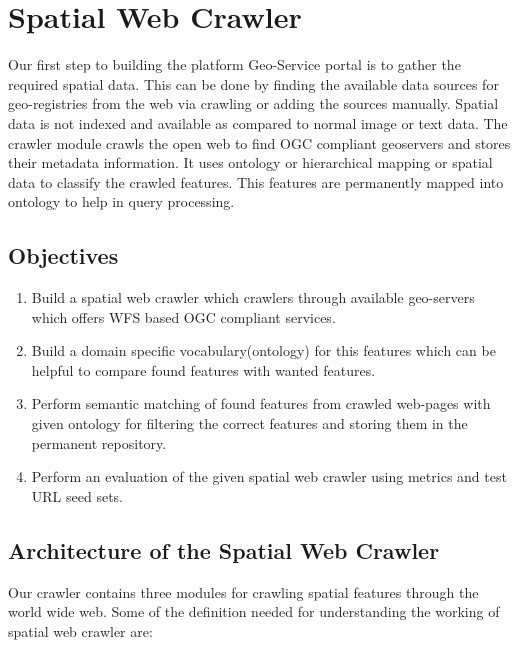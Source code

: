 \chapter{Spatial Web Crawler}
Our first step to building the platform Geo-Service portal is to gather the required spatial data. This can be done by finding the available data sources for geo-registries from the web via crawling or adding the sources manually. Spatial data is not indexed and available as compared to normal image or text data. The crawler module crawls the open web to find OGC compliant geoservers and stores their metadata information. It uses ontology or hierarchical mapping or spatial data to classify the crawled features. This features are permanently mapped into ontology to help in query processing.

\section{Objectives}
\begin{enumerate}
\item Build a spatial web crawler which crawlers through available geo-servers which offers WFS
based OGC compliant services.
\item Build a domain specific vocabulary(ontology) for this features which can be helpful to
compare found features with wanted features.
\item Perform semantic matching of found features from crawled web-pages with given
ontology for filtering the correct features and storing them in the permanent repository.
\item Perform an evaluation of the given spatial web crawler using metrics and test URL seed
sets.
\end{enumerate}


\section{Architecture of the Spatial Web Crawler}
Our crawler contains three modules for crawling spatial features through the world wide web.
Some of the definition needed for understanding the working of spatial web crawler are:\\


